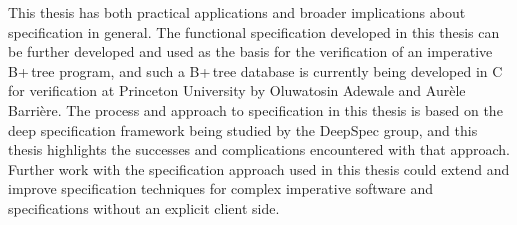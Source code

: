\documentclass[12pt]{article}
\begin{document}
This thesis has both practical applications and broader implications about specification in general. The functional specification developed in this thesis can be further developed and used as the basis for the verification of an imperative B+\,tree program, and such a B+\,tree database is currently being developed in C for verification at Princeton University by Oluwatosin Adewale and Aurèle Barrière. The process and approach to specification in this thesis is based on the deep specification framework being studied by the DeepSpec group, and this thesis highlights the successes and complications encountered with that approach. Further work with the specification approach used in this thesis could extend and improve specification techniques for complex imperative software and specifications without an explicit client side.

\clearpage
\end{document}
